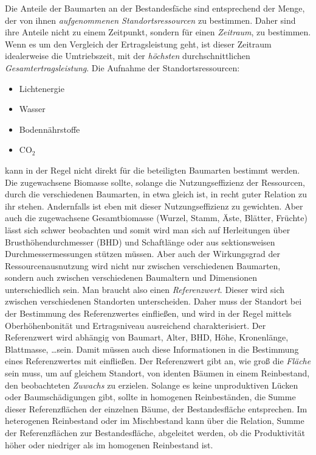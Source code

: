 \documentclass[twocolumn]{scrartcl}
\begin{document}
Die Anteile der Baumarten an der Bestandesfäche sind entsprechend der Menge, der
von ihnen \emph{aufgenommenen Standortsressourcen} zu bestimmen. Daher sind ihre
Anteile nicht zu einem Zeitpunkt, sondern für einen \emph{Zeitraum}, zu
bestimmen. Wenn es um den Vergleich der Ertragsleistung geht, ist dieser
Zeitraum idealerweise die Umtriebszeit, mit der \emph{höchsten}
durchschnittlichen \emph{Gesamtertragsleistung}. Die Aufnahme der
Standortsressourcen:
\begin{itemize}
\item Lichtenergie
\item Wasser
\item Bodennährstoffe
\item CO$_2$
\end{itemize}
kann in der Regel nicht direkt für die beteiligten Baumarten bestimmt werden.
Die zugewachsene Biomasse sollte, solange die Nutzungseffizienz der Ressourcen,
durch die verschiedenen Baumarten, in etwa gleich ist, in recht guter Relation
zu ihr stehen. Andernfalls ist eben mit dieser Nutzungseffizienz zu gewichten.
Aber auch die zugewachsene Gesamtbiomasse (Wurzel, Stamm, Äste, Blätter,
Früchte) lässt sich schwer beobachten und somit wird man sich auf Herleitungen
über Brusthöhendurchmesser (BHD) und Schaftlänge oder aus sektionsweisen
Durchmessermessungen stützen müssen. Aber auch der Wirkungsgrad der
Ressourcenausnutzung wird nicht nur zwischen verschiedenen Baumarten, sondern
auch zwischen verschiedenen Baumaltern und Dimensionen unterschiedlich sein. Man
braucht also einen \emph{Referenzwert}. Dieser wird sich zwischen verschiedenen
Standorten unterscheiden. Daher muss der Standort bei der Bestimmung des
Referenzwertes einfließen, und wird in der Regel mittels Oberhöhenbonität und
Ertragsniveau ausreichend charakterisiert. Der Referenzwert wird abhängig von Baumart, Alter, BHD, Höhe, Kronenlänge,
Blattmasse, \dots sein. Damit müssen auch diese Informationen in die Bestimmung
eines Referenzwertes mit einfließen. Der Referenzwert gibt an, wie groß die
\emph{Fläche} sein muss, um auf gleichem Standort, von identen Bäumen in einem
Reinbestand, den beobachteten \emph{Zuwachs} zu erzielen. Solange es keine
unproduktiven Lücken oder Baumschädigungen gibt, sollte in homogenen
Reinbeständen, die Summe dieser Referenzflächen der einzelnen Bäume, der
Bestandesfläche entsprechen. Im heterogenen Reinbestand oder im Mischbestand
kann über die Relation, Summe der Referenzflächen zur Bestandesfläche,
abgeleitet werden, ob die Produktivität höher oder niedriger als im homogenen
Reinbestand ist.
\end{document}
